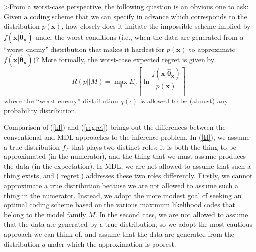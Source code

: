 \documentclass{elsart}
\begin{document}
>From a worst-case perspective, the following question is an obvious one to ask: Given a coding
scheme that we can specify in advance which corresponds to the distribution $p(\bm x)$, how
closely does it imitate the impossible scheme implied by $f(\bm x |\hat{\bm\theta}_{\bm x})$ under
the worst conditions (i.e., when the data are generated from a ``worst enemy'' distribution that
makes it hardest for $p(\bm x)$ to approximate $f(\bm x |\hat{\bm\theta}_{\bm x})$)? More
formally, the worst-case expected regret is given by
\begin{equation}\label{regret}
R(p||M)=\max_{q} E_{q}\left[\ln\frac{\displaystyle f(\bm x |\hat{\bm\theta}_{\bm
x})}{\displaystyle p(\bm x)}\right]
\end{equation}
where the ``worst enemy'' distribution $q(\cdot)$ is allowed to be (almost) any probability
distribution.

Comparison of (\ref{kl}) and (\ref{regret}) brings out the differences between the conventional
and MDL approaches to the inference problem. In (\ref{kl}), we assume a true distribution $f_{T}$
that plays two distinct roles: it is both the thing to be approximated (in the numerator), and the
thing that we must assume produces the data (in the expectation). In MDL, we are not allowed to
assume that such a thing exists, and (\ref{regret}) addresses these two roles differently.
Firstly, we cannot approximate a true distribution because we are not allowed to assume such a
thing in the numerator. Instead, we adopt the more modest goal of seeking an optimal coding scheme
based on the various maximum likelihood codes that belong to the model family $M$. In the second
case, we are not allowed to assume that the data are generated by a true distribution, so we adopt
the most cautious approach we can think of, and assume that the data are generated from the
distribution $q$ under which the approximation is poorest.
\end{document}
